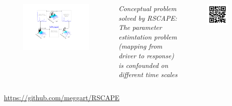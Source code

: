 \begin{columns}
	\begin{figure}[tb]
	\begin{center}
		\includegraphics[width=.95\textwidth]{images/content/FIG1.pdf}
	\end{center}
	\end{figure}
\small{\textit{Conceptual problem solved by RSCAPE: The parameter estimtation problem (mapping from driver to response) is confounded on different time scales}}
\vspace{4cm}
	\begin{figure}[tb]
		\includegraphics[width=.6\textwidth]{images/qrcode-RSCAPE.jpg}
	\end{figure}
\end{columns}
\vspace{1cm}
\hfill\large{\url{https://github.com/meggart/RSCAPE}}
\vfill
